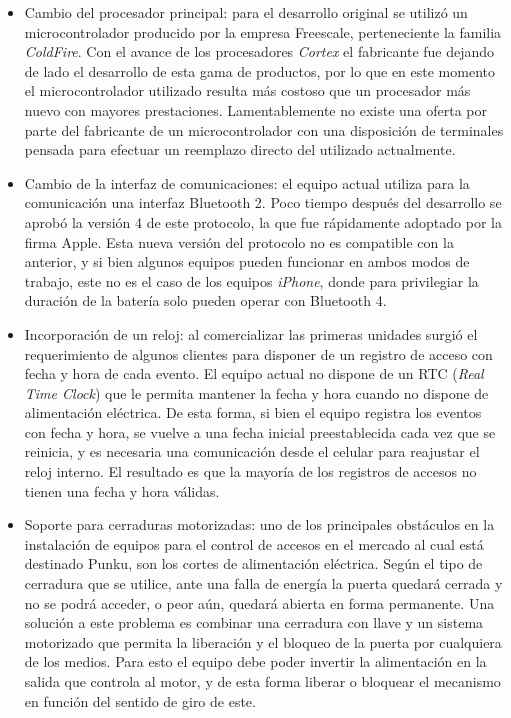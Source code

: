 \begin{itemize}
	\item Cambio del procesador principal: para el desarrollo original se utilizó un microcontrolador producido por la empresa Freescale, perteneciente la familia \emph{ColdFire}\cite{noauthor_nxp_2019}. Con el avance de los procesadores \emph{Cortex} el fabricante fue dejando de lado el desarrollo de esta gama de productos, por lo que en este momento el microcontrolador utilizado resulta más costoso que un procesador más nuevo con mayores prestaciones. Lamentablemente no existe una oferta por parte del fabricante de un microcontrolador con una disposición de terminales pensada para efectuar un reemplazo directo del utilizado actualmente.
	
	\item Cambio de la interfaz de comunicaciones: el equipo actual utiliza para la comunicación una interfaz Bluetooth 2. Poco tiempo después del desarrollo se aprobó la versión 4 de este protocolo, la que fue rápidamente adoptado por la firma Apple. Esta nueva versión del protocolo no es compatible con la anterior, y si bien algunos equipos pueden funcionar en ambos modos de trabajo, este no es el caso de los equipos \emph{iPhone}, donde para privilegiar la duración de la batería solo pueden operar con Bluetooth 4.
	
	\item Incorporación de un reloj: al comercializar las primeras unidades surgió el requerimiento de algunos clientes para disponer de un registro de acceso con fecha y hora de cada evento. El equipo actual no dispone de un RTC (\emph{Real Time Clock}) que le permita mantener la fecha y hora cuando no dispone de alimentación eléctrica. De esta forma, si bien el equipo registra los eventos con fecha y hora, se vuelve a una fecha inicial preestablecida cada vez que se reinicia, y es necesaria una comunicación desde el celular para reajustar el reloj interno. El resultado es que la mayoría de los registros de accesos no tienen una fecha y hora válidas.
	
	\item Soporte para cerraduras motorizadas: uno de los principales obstáculos en la instalación de equipos para el control de accesos en el mercado al cual está destinado Punku, son los cortes de alimentación eléctrica. Según el tipo de cerradura que se utilice, ante una falla de energía la puerta quedará cerrada y no se podrá acceder, o peor aún, quedará abierta en forma permanente. Una solución a este problema es combinar una cerradura con llave y un sistema motorizado que permita la liberación y el bloqueo de la puerta por cualquiera de los medios. Para esto el equipo debe poder invertir la alimentación en la salida que controla al motor, y de esta forma liberar o bloquear el mecanismo en función del sentido de giro de este.
	

\end{itemize}
